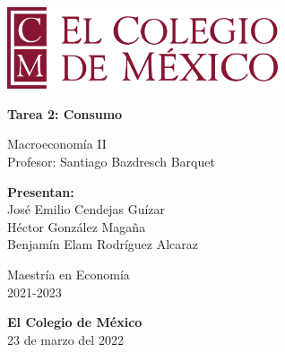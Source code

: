 \begin{titlepage}
   \begin{center}
       \vspace*{1cm}
      
        \includegraphics[width=0.6\textwidth]{COLMEX.png}
        
        \vspace*{1cm}

       \textbf{Tarea 2: Consumo}

       \vspace{0.5cm}
        Macroeconomía II \\
        \vspace{0.5cm}
        Profesor: Santiago Bazdresch Barquet
            
       \vspace{1.5cm}

       \textbf{Presentan:} \\
       \vspace{0.5cm}
       José Emilio Cendejas Guízar\\ 
       Héctor González Magaña\\ 
       Benjamín Elam Rodríguez Alcaraz 
       
       

       \vspace{3cm}
            
       Maestría en Economía\\
       2021-2023
            
       \vspace{0.8cm}
     
            
       \textbf{El Colegio de México}\\
       23 de marzo del 2022
            
   \end{center}
\end{titlepage}